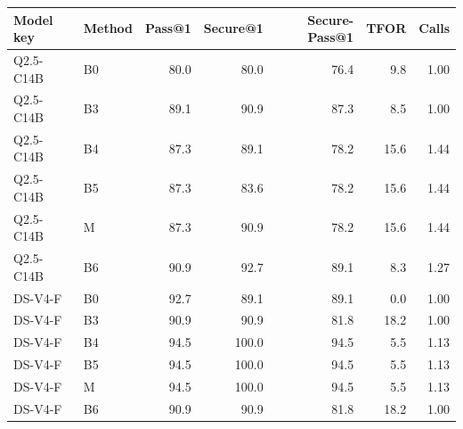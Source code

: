 \begin{tabular}{llrrrrr}
\toprule
Model key & Method & Pass@1 & Secure@1 & \textbf{Secure-Pass@1} & TFOR & Calls \\
\midrule
Q2.5-C14B & B0 & 80.0 & 80.0 & 76.4 & 9.8 & 1.00 \\
Q2.5-C14B & B3 & 89.1 & 90.9 & 87.3 & 8.5 & 1.00 \\
Q2.5-C14B & B4 & 87.3 & 89.1 & 78.2 & 15.6 & 1.44 \\
Q2.5-C14B & B5 & 87.3 & 83.6 & 78.2 & 15.6 & 1.44 \\
Q2.5-C14B & M & 87.3 & 90.9 & 78.2 & 15.6 & 1.44 \\
Q2.5-C14B & B6 & 90.9 & 92.7 & 89.1 & 8.3 & 1.27 \\
\midrule
DS-V4-F & B0 & 92.7 & 89.1 & 89.1 & 0.0 & 1.00 \\
DS-V4-F & B3 & 90.9 & 90.9 & 81.8 & 18.2 & 1.00 \\
DS-V4-F & B4 & 94.5 & 100.0 & 94.5 & 5.5 & 1.13 \\
DS-V4-F & B5 & 94.5 & 100.0 & 94.5 & 5.5 & 1.13 \\
DS-V4-F & M & 94.5 & 100.0 & 94.5 & 5.5 & 1.13 \\
DS-V4-F & B6 & 90.9 & 90.9 & 81.8 & 18.2 & 1.00 \\
\bottomrule
\end{tabular}
